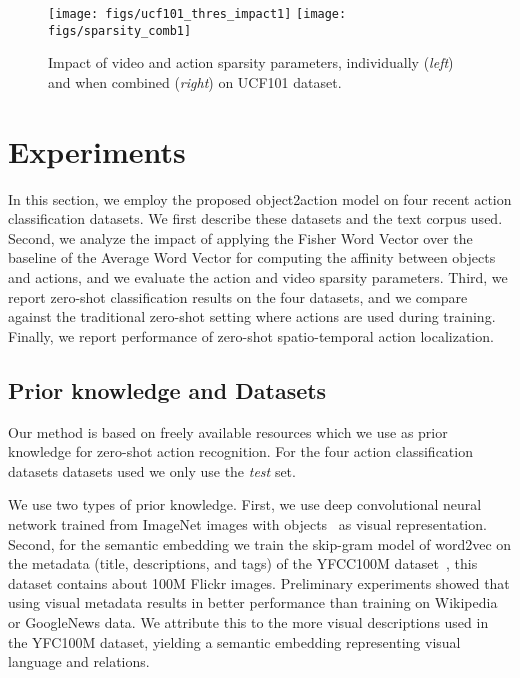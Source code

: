 
\begin{figure*}[t]
\centering
  \texttt{[image: figs/ucf101\_thres\_impact1]}	
  \texttt{[image: figs/sparsity\_comb1]}
  \caption{Impact of video  and action  sparsity parameters, individually (\emph{left}) and when combined (\emph{right}) on UCF101 dataset.}
\label{fig:impact_sparse}
\end{figure*}


\section{Experiments} \label{sec:exp}
In this section, we employ the proposed object2action model on four recent action classification datasets.
We first describe these datasets and the text corpus used.
Second, we analyze the impact of applying the Fisher Word Vector over the baseline of the Average Word Vector for computing the affinity between objects and actions, and we evaluate the action and video sparsity parameters. 
Third, we report zero-shot classification results on the four datasets, and we compare against  the traditional zero-shot setting where actions are used during training. 
Finally, we report performance of zero-shot spatio-temporal action localization.

\subsection{Prior knowledge and Datasets}
Our method is based on freely available resources which we use as prior knowledge for zero-shot action recognition. For the four action classification datasets datasets used we only use the \emph{test} set.


We use two types of prior knowledge.
First, we use deep convolutional neural network trained from ImageNet images with objects~\cite{Krizhevsky_imagenetclassification} as visual representation.
Second, for the semantic embedding we train the skip-gram model of word2vec on the metadata (title, descriptions, and tags) of the YFCC100M dataset~\cite{thomee15yfcc100m}, this dataset contains about 100M Flickr images. 
Preliminary experiments showed that using visual metadata results in better performance than training on Wikipedia or GoogleNews data. 
We attribute this to the more visual descriptions used in the YFC100M dataset, yielding a semantic embedding representing visual language and relations.



